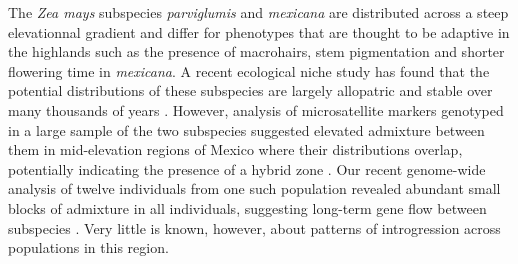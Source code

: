 The \emph {Zea mays} subspecies \emph{parviglumis} and \emph{mexicana} are distributed across a steep elevationnal gradient and differ for phenotypes that are thought to be adaptive in the highlands such as the presence of macrohairs, stem pigmentation and shorter flowering time in \emph{mexicana}.
A recent ecological niche study has found that the potential distributions of these subspecies are largely allopatric and stable over many thousands of years \citep{hufford2012inferences}.
However, analysis of microsatellite markers genotyped in a large sample of the two subspecies suggested elevated admixture between them in mid-elevation regions of Mexico where their distributions overlap, potentially indicating the presence of a hybrid zone \citep{Fukunaga2005}.  
Our recent genome-wide analysis of twelve individuals from one such population revealed abundant small blocks of admixture in all individuals, suggesting long-term gene flow between subspecies \citep{Pyhajarvi2013}.  
Very little is known, however, about patterns of introgression across populations in this region.

